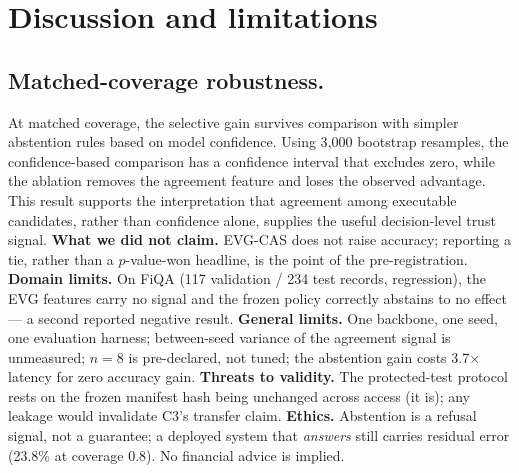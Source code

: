 \documentclass[conference]{IEEEtran}
\begin{document}
\begin{table}[t]
\centering
\caption{Reproducibility checklist for the reported experiments.}
\label{tab:repro-check}
\small
{}
\end{table}

\section{Discussion and limitations}
\subsection{Matched-coverage robustness.}
At matched coverage, the selective gain survives comparison with simpler abstention rules
based on model confidence. Using 3{,}000 bootstrap resamples, the confidence-based
comparison has a confidence interval that excludes zero, while the ablation removes the
agreement feature and loses the observed advantage. This result supports the interpretation
that agreement among executable candidates, rather than confidence alone, supplies the
useful decision-level trust signal.
\textbf{What we did not claim.} EVG-CAS does not raise accuracy; reporting a tie, rather
than a $p$-value-won headline, is the point of the pre-registration. \textbf{Domain limits.}
On FiQA (117 validation / 234 test records, regression), the EVG features carry no signal
and the frozen policy correctly abstains to no effect --- a second reported negative result.
\textbf{General limits.} One backbone, one seed, one evaluation harness; between-seed
variance of the agreement signal is unmeasured; $n{=}8$ is pre-declared, not tuned; the
abstention gain costs 3.7$\times$ latency for zero accuracy gain. \textbf{Threats to
validity.} The protected-test protocol rests on the frozen manifest hash being unchanged
across access (it is); any leakage would invalidate C3's transfer claim. \textbf{Ethics.}
Abstention is a refusal signal, not a guarantee; a deployed system that \emph{answers} still
carries residual error (23.8\% at coverage 0.8). No financial advice is implied.
\end{document}
